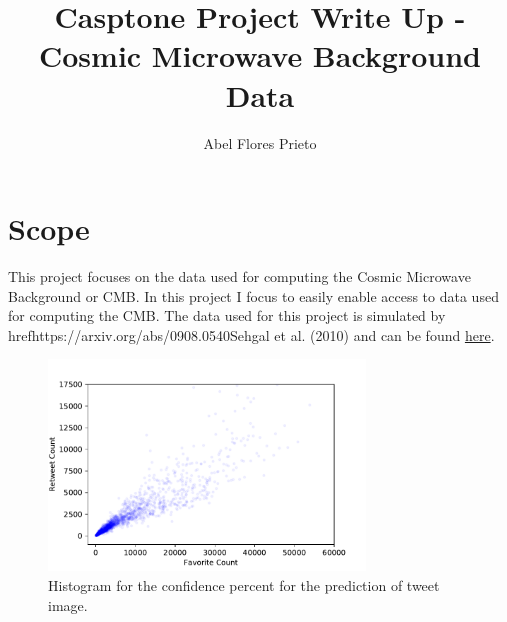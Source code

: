 \documentclass[12pt,letterpaper]{article}
\author{Abel Flores Prieto}
\title{Casptone Project Write Up - Cosmic Microwave Background Data}
\begin{document}
\maketitle

\section{Scope}
This project focuses on the data used for computing the Cosmic Microwave
Background or CMB. In this project I focus to easily enable access to data used
for computing the CMB. The data used for this project is simulated by
href{https://arxiv.org/abs/0908.0540}{Sehgal et al. (2010)} and can be found
\href{https://lambda.gsfc.nasa.gov/simulation/tb\_sim\_ov.cfm}{here}.



\begin{figure}[h!]
    \centering
    \includegraphics[width=0.75\textwidth]{imgs/sample_figure.pdf}
    \caption{\label{fig:test}Histogram for the confidence percent for
    the prediction of tweet image.}
\end{figure}
\end{document}
